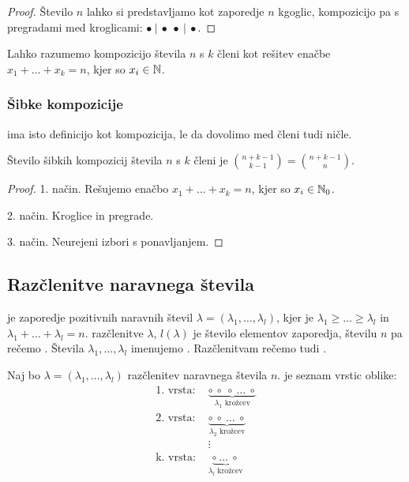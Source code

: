 \begin{proof}
    Število $n$ lahko si predstavljamo kot zaporedje $n$ kgoglic, kompozicijo pa s pregradami med kroglicami: $\bullet~|~\bullet~\bullet~|~\bullet$.
\end{proof}

\begin{opomba}
    Lahko razumemo kompozicijo števila $n$ s $k$ členi kot rešitev enačbe $x_1 + \ldots + x_k = n$, kjer so $x_i \in \mathbb{N}$.
\end{opomba}

\subsubsection{Šibke kompozicije}
 ima isto definicijo kot kompozicija, le da dovolimo med členi tudi ničle.

\begin{trditev}
    Število šibkih kompozicij števila $n$ s $k$ členi je $\binom{n+k-1}{k-1} = \binom{n+k-1}{n}$.
\end{trditev}

\begin{proof}
    1. način. Rešujemo enačbo $x_1 + \ldots + x_k = n$, kjer so $x_i \in \mathbb{N}_0$.

    2. način. Kroglice in pregrade.

    3. način. Neurejeni izbori s ponavljanjem.
\end{proof}

\subsection{Razčlenitve naravnega števila}
\begin{definicija}
     je zaporedje pozitivnih naravnih števil $\lambda = (\lambda_1, \ldots, \lambda_l)$, kjer je $\lambda_1 \geq \ldots \geq \lambda_l$ in $\lambda_1 + \ldots + \lambda_l = n$.  razčlenitve $\lambda$, $l(\lambda)$ je število elementov zaporedja, številu $n$ pa rečemo . Števila $\lambda_1, \ldots, \lambda_l$ imenujemo . Razčlenitvam rečemo tudi .
\end{definicija}

\begin{definicija}
    Naj bo $\lambda = (\lambda_1, \ldots, \lambda_l)$ razčlenitev naravnega števila $n$.  je seznam vrstic oblike:
    \begin{align*}
        \text{1. vrsta: } &\underbrace{\circ \ \circ \ \circ \ \ldots \ \circ}_{\lambda_1 \text{ krožcev}} \\
        \text{2. vrsta: } &\underbrace{\circ \ \circ \ \ldots \ \circ}_{\lambda_2 \text{ krožcev}} \\
        &\vdots \\
        \text{k. vrsta: } &\underbrace{\circ \ \ldots \ \circ}_{\lambda_l \text{ krožcev}}
    \end{align*}
\end{definicija}

